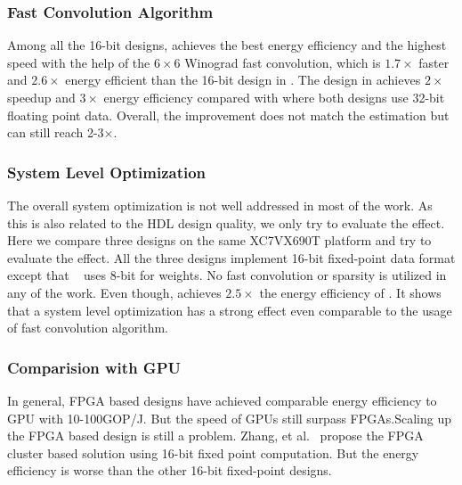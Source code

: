 \subsubsection{Fast Convolution Algorithm} Among all the 16-bit designs, \cite{lu2017evaluating} achieves the best energy efficiency and the highest speed with the help of the $6\times 6$ Winograd fast convolution, which is $1.7\times$ faster and $2.6\times$ energy efficient than the 16-bit design in \cite{zhang2017improving}. The design in \cite{zhang2017frequency} achieves $2\times$ speedup and $3\times$ energy efficiency compared with \cite{zhang2015optimizing} where both designs use 32-bit floating point data. Overall, the improvement does not match the estimation but can still reach 2-3$\times$.

\subsubsection{System Level Optimization} The overall system optimization is not well addressed in most of the work. As this is also related to the HDL design quality, we only try to evaluate the effect. Here we compare three designs\cite{zhang2016caffeine, liu2016automatic, li2016high} on the same XC7VX690T platform and try to evaluate the effect. All the three designs implement 16-bit fixed-point data format except that ~\cite{liu2016automatic} uses 8-bit for weights. No fast convolution or sparsity is utilized in any of the work. Even though, \cite{li2016high} achieves $2.5\times$ the energy efficiency of \cite{liu2016automatic}. It shows that a system level optimization has a strong effect even comparable to the usage of fast convolution algorithm. 

\subsubsection{Comparision with GPU} In general, FPGA based designs have achieved comparable energy efficiency to GPU with 10-100GOP/J. But the speed of GPUs still surpass FPGAs.Scaling up the FPGA based design is still a problem. Zhang, et al.~\cite{zhang2016energy} propose the FPGA cluster based solution using 16-bit fixed point computation. But the energy efficiency is worse than the other 16-bit fixed-point designs. 

